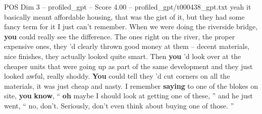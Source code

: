 \begin{textsample}{POS Dim 3 – profiled\_gpt – Score 4.00 – profiled\_gpt/t000438\_gpt.txt}  \label{ex:f3_pos_028}
yeah it basically meant affordable housing, that was the gist of it, but they had some fancy term for it I just can't remember.
When we were doing the riverside bridge, \textbf{you} could really see the difference.
The ones right on the river, the proper expensive ones, they ’d clearly thrown good money at them – decent materials, nice finishes, they actually looked quite smart.
Then \textbf{you} ’d look over at the cheaper units that were going up as part of the same development and they just looked awful, really shoddy. \textbf{You} could tell they ’d cut corners on all the materials, it was just cheap and nasty.
I remember \textbf{saying} to one of the blokes on site, \textbf{you} \textbf{know}, “ \textbf{oh} maybe I should look at getting one of these, ” and he just went, “ no, don't.
Seriously, don't even think about buying one of those. ”

\end{textsample}
